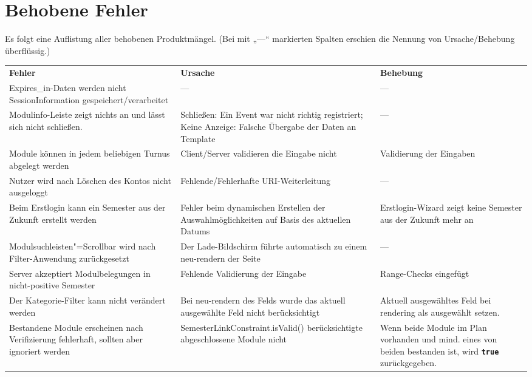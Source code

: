 \FloatBarrier
\section{Behobene Fehler}

Es folgt eine Auflistung aller behobenen Produktmängel. (Bei mit „---“ markierten Spalten erschien die Nennung von Ursache/Behebung überflüssig.)


\begin{longtable}{| >{\hspace{0pt}} p{} | >{\hspace{0pt}} p{} | >{\hspace{0pt}} p{} | }
	\hline
	\textbf{Fehler} & \textbf{Ursache}  & \textbf{Behebung} \\ 
	\hhline{|=|=|=|}
	\endfirsthead
	\endhead
	Expires\_in-Daten werden nicht SessionInformation gespeichert/verarbeitet & --- & --- \\
	\hline
	Modulinfo-Leiste zeigt nichts an und lässt sich nicht schließen. & Schließen: Ein Event war nicht richtig registriert; Keine Anzeige: Falsche Übergabe der Daten an Template & --- \\
	\hline
	Module können in jedem beliebigen Turnus abgelegt werden & Client/Server validieren die Eingabe nicht & Validierung der Eingaben \\
	\hline
	Nutzer wird nach Löschen des Kontos nicht ausgeloggt & Fehlende/Fehlerhafte URI-Weiterleitung & --- \\
	\hline
	Beim Erstlogin kann ein Semester aus der Zukunft erstellt werden & Fehler beim dynamischen Erstellen der Auswahlmöglichkeiten auf Basis des aktuellen Datums & Erstlogin-Wizard zeigt keine Semester aus der Zukunft mehr an \\
	\hline
	Modulsuchleisten"=Scrollbar wird nach Filter-Anwendung zurückgesetzt & Der Lade-Bildschirm führte automatisch zu einem neu-rendern der Seite & --- \\
	\hline
	Server akzeptiert Modulbelegungen in nicht-positive Semester & Fehlende Validierung der Eingabe & Range-Checks eingefügt \\
	\hline
	Der Kategorie-Filter kann nicht verändert werden & Bei neu-rendern des Felds wurde das aktuell ausgewählte Feld nicht berücksichtigt & Aktuell ausgewähltes Feld bei rendering als ausgewählt setzen. \\
	\hline
	Bestandene Module erscheinen nach Verifizierung fehlerhaft, sollten aber ignoriert werden & SemesterLinkConstraint.isValid() berücksichtigte abgeschlossene Module nicht & Wenn beide Module im Plan vorhanden und mind. eines von beiden bestanden ist, wird \texttt{\textbf{true}} zurückgegeben. \\

\end{longtable}

